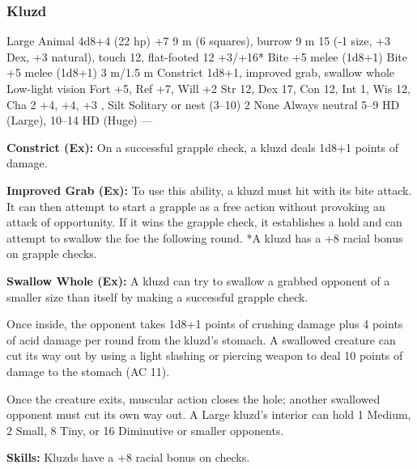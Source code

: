 \subsubsection{Kluzd}
\begin{MonsterStats}
{Large Animal}
{4d8+4 (22 hp)}
{+7}
{9 m (6 squares), burrow 9 m}
{15 (-1 size, +3 Dex, +3 natural), touch 12, flat-footed 12}
{+3/+16*}
{Bite +5 melee (1d8+1)}
{Bite +5 melee (1d8+1)}
{3 m/1.5 m}
{Constrict 1d8+1, improved grab, swallow whole}
{Low-light vision}
{Fort +5, Ref +7, Will +2}
{Str 12, Dex 17, Con 12, Int 1, Wis 12, Cha 2}
{ +4,  +4,  +3}
{, }
{Silt}
{Solitary or nest (3--10)}
{2}
{None}
{Always neutral}
{5--9 HD (Large), 10--14 HD (Huge)}
{---}
\end{MonsterStats}

\textbf{Constrict (Ex):} On a successful grapple check, a kluzd deals 1d8+1 points of damage.

\textbf{Improved Grab (Ex):} To use this ability, a kluzd must hit with its bite attack. It can then attempt to start a grapple as a free action without provoking an attack of opportunity. If it wins the grapple check, it establishes a hold and can attempt to swallow the foe the following round. *A kluzd has a +8 racial bonus on grapple checks.

\textbf{Swallow Whole (Ex):} A kluzd can try to swallow a grabbed opponent of a smaller size than itself by making a successful grapple check.

Once inside, the opponent takes 1d8+1 points of crushing damage plus 4 points of acid damage per round from the kluzd's stomach. A swallowed creature can cut its way out by using a light slashing or piercing weapon to deal 10 points of damage to the stomach (AC 11).

Once the creature exits, muscular action closes the hole; another swallowed opponent must cut its own way out. A Large kluzd's interior can hold 1 Medium, 2 Small, 8 Tiny, or 16 Diminutive or smaller opponents.

\textbf{Skills:} Kluzds have a +8 racial bonus on  checks.
